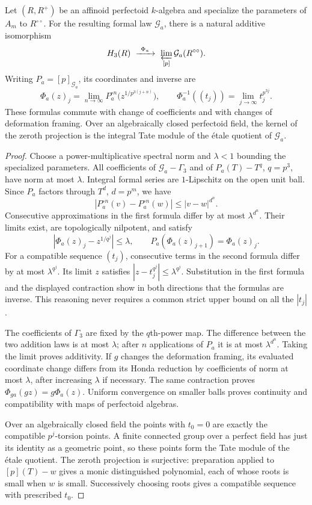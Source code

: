 \begin{lemma}\label{h3:geom:universal-cover}
Let $(R,R^+)$ be an affinoid perfectoid $k$-algebra and specialize the
parameters of $A_m$ to $R^{\circ\circ}$.  For the resulting formal law
$\mathcal G_a$, there is a natural additive isomorphism
\[
 H_3(R)\ \xrightarrow{\ \Phi_a\ }\
 \varprojlim_{[p]}\mathcal G_a(R^{\circ\circ}).
\]
Writing $P_a=[p]_{\mathcal G_a}$, its coordinates and inverse are
\begin{equation}\label{h3:geom:cover-formulas}
 \Phi_a(z)_j=\lim_{n\to\infty}
 P_a^{\circ n}\bigl(z^{1/p^{3(j+n)}}\bigr),\qquad
 \Phi_a^{-1}((t_j))=\lim_{j\to\infty}t_j^{p^{3j}}.
\end{equation}
These formulas commute with change of coefficients and with changes
of deformation framing.  Over an algebraically closed perfectoid
field, the kernel of the zeroth projection is the integral Tate
module of the \'etale quotient of $\mathcal G_a$.
\end{lemma}

\begin{proof}
Choose a power-multiplicative spectral norm and $\lambda<1$ bounding
the specialized parameters.  All coefficients of
$\mathcal G_a-\Gamma_3$ and of $P_a(T)-T^q$, $q=p^3$, have norm at
most $\lambda$.  Integral formal series are $1$-Lipschitz on the open
unit ball.  Since $P_a$ factors through $T^d$, $d=p^m$, we have
\[
 |P_a^{\circ n}(v)-P_a^{\circ n}(w)|\leq |v-w|^{d^n}.
\]
Consecutive approximations in the first formula differ by at most
$\lambda^{d^n}$.  Their limits exist, are topologically nilpotent,
and satisfy
\[
 |\Phi_a(z)_j-z^{1/q^j}|\leq\lambda,
 \qquad P_a(\Phi_a(z)_{j+1})=\Phi_a(z)_j.
\]
For a compatible sequence $(t_j)$, consecutive terms in the second
formula differ by at most $\lambda^{q^j}$.  Its limit $z$ satisfies
$|z-t_j^{q^j}|\leq\lambda^{q^j}$.  Substitution in the first formula
and the displayed contraction show in both directions that the
formulas are inverse.  This reasoning never requires a common
strict upper bound on all the $|t_j|$.

The coefficients of $\Gamma_3$ are fixed by the $q$th-power map.
The difference between the two addition laws is at most $\lambda$;
after $n$ applications of $P_a$ it is at most $\lambda^{d^n}$.
Taking the limit proves additivity.  If $g$ changes the deformation
framing, its evaluated coordinate change differs from its Honda
reduction by coefficients of norm at most $\lambda$, after increasing
$\lambda$ if necessary.  The same contraction proves
$\Phi_{ga}(gz)=g\Phi_a(z)$.  Uniform convergence on smaller balls
proves continuity and compatibility with maps of perfectoid
algebras.

Over an algebraically closed field the points with $t_0=0$ are exactly
the compatible $p^j$-torsion points.  A finite connected group over a
perfect field has just its identity as a geometric point, so these
points form the Tate module of the \'etale quotient.  The zeroth
projection is surjective: preparation applied to $[p](T)-w$ gives a
monic distinguished polynomial, each of whose roots is small when
$w$ is small.  Successively choosing roots gives a compatible
sequence with prescribed $t_0$.
\end{proof}

